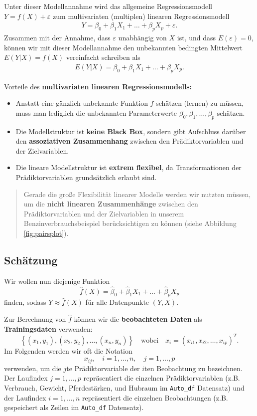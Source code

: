 \documentclass[
  ngerman,
]{book}
\providecommand{\tightlist}{%
  \setlength{\itemsep}{0pt}\setlength{\parskip}{0pt}}
\begin{document}
Unter dieser Modellannahme wird das allgemeine Regressionsmodell \(Y=f(X)+\varepsilon\) zum multivariaten (multiplen) linearen Regressionsmodell
\begin{align*}
Y=\beta_0+\beta_1X_1+\dots+\beta_pX_p+\varepsilon.
\end{align*}
Zusammen mit der Annahme, dass \(\varepsilon\) unabhängig von \(X\) ist, und dass \(E(\varepsilon)=0\), können wir mit dieser Modellannahme den unbekannten bedingten Mittelwert \(E(Y|X)=f(X)\) vereinfacht schreiben als
\begin{align*}
E(Y|X)=\beta_0+\beta_1X_1+\dots+\beta_pX_p.
\end{align*}

Vorteile des \textbf{multivariaten linearen Regressionsmodells:}

\begin{itemize}
\tightlist
\item
  Anstatt eine gänzlich unbekannte Funktion \(f\) schätzen (lernen) zu müssen, muss man lediglich die unbekannten Parameterwerte \(\beta_0, \beta_1, \dots, \beta_p\) schätzen.
\item
  Die Modellstruktur ist \textbf{keine Black Box}, sondern gibt Aufschluss darüber den \textbf{assoziativen Zusammenhang} zwischen den Prädiktorvariablen und der Zielvariablen.
\item
  Die lineare Modellstruktur ist \textbf{extrem flexibel}, da Transformationen der Prädiktorvariablen grundsätzlich erlaubt sind.
\end{itemize}

\begin{quote}
Gerade die große Flexibilität linearer Modelle werden wir nutzten müssen, um die \textbf{nicht linearen Zusammenhänge} zwischen den Prädiktorvariablen und der Zielvariablen in unserem Benzinverbrauchsbeispiel berücksichtigen zu können (siehe Abbildung \ref{fig:pairsplot}).
\end{quote}

\hypertarget{schuxe4tzung}{%
\subsection{Schätzung}\label{schuxe4tzung}}

Wir wollen nun diejenige Funktion
\[
\hat{f}(X)=\hat{\beta}_0 + \hat{\beta}_1 X_1 + \dots + \hat{\beta}_p X_p
\]
finden, sodass \(Y\approx \hat{f}(X)\) für alle Datenpunkte \((Y,X)\).

Zur Berechnung von \(\hat{f}\) können wir die \textbf{beobachteten Daten} als \textbf{Trainingsdaten} verwenden:
\[
\left\{(x_1,y_1),(x_2,y_2),\dots,(x_n,y_n)\right\}\quad\text{wobei}\quad x_i=(x_{i1},x_{i2},\dots,x_{ip})^T.
\]
Im Folgenden werden wir oft die Notation
\[x_{ij},\quad i=1,\dots,n,\quad j=1,\dots,p\]
verwenden, um die \(j\)te Prädiktorvariable der \(i\)ten Beobachtung zu bezeichnen. Der Laufindex \(j=1,\dots,p\) repräsentiert die einzelnen Prädiktorvariablen (z.B. Verbrauch, Gewicht, Pferdestärken, und Hubraum im \texttt{Auto\_df} Datensatz) und der Laufindex \(i=1,\dots,n\) repräsentiert die einzelnen Beobachtungen (z.B. gespeichert als Zeilen im \texttt{Auto\_df} Datensatz).
\end{document}
